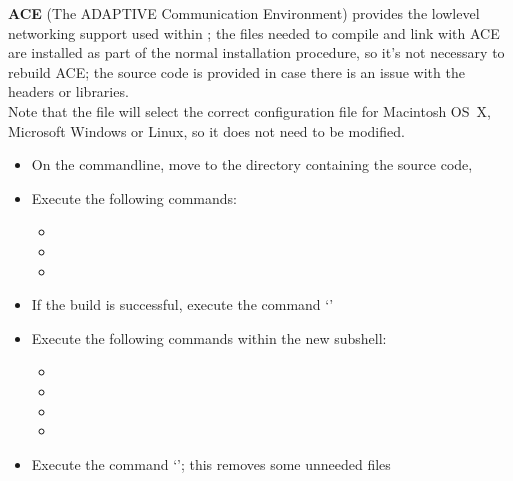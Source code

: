 \secondaryEnd{}
\textbf{ACE} (The ADAPTIVE Communication Environment) provides the low\longDash{}level
networking support used within \mplusm{}; the files needed to compile and link with ACE
are installed as part of the normal \mplusm{} installation procedure, so it's not
necessary to rebuild ACE; the source code is provided in case there is an issue with the
headers or libraries.\\

Note that the file  will select the correct
configuration file for Macintosh OS~X, Microsoft Windows or Linux, so it does not need to
be modified.
\begin{itemize}
\item On the command\longDash{}line, move to the directory containing the \mplusm{} source
code, 
\item\exSp{} Execute the following commands:
\begin{itemize}
\item{}
\item\exSp{}
\item\exSp{}
\end{itemize}
\item\exSp{} If the build is successful, execute the command `'
\item\exSp{} Execute the following commands within the new subshell:
\begin{itemize}
\item{}
\item\exSp{}
\item\exSp{}
\item\exSp{}
\end{itemize}
\item\exSp{} Execute the command `'; this removes some
unneeded files
\end{itemize}
\tertiaryEnd{}

